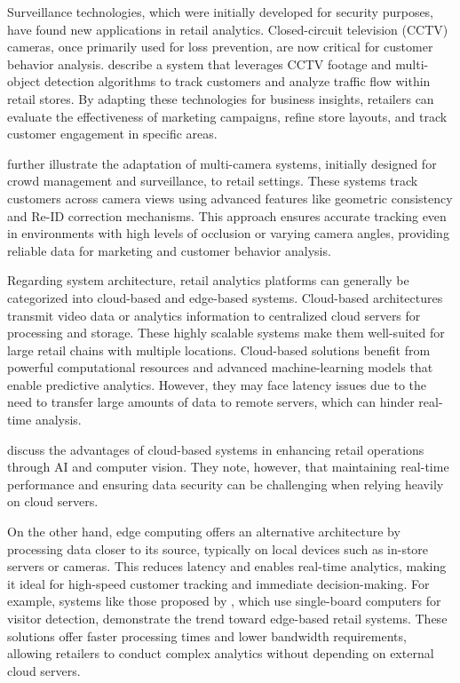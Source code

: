 {Surveillance technologies, which were initially developed for security purposes, have found new applications in retail analytics. Closed-circuit television (CCTV) cameras, once primarily used for loss prevention, are now critical for customer behavior analysis. \cite{Cobos2019} describe a system that leverages CCTV footage and multi-object detection algorithms to track customers and analyze traffic flow within retail stores. By adapting these technologies for business insights, retailers can evaluate the effectiveness of marketing campaigns, refine store layouts, and track customer engagement in specific areas.

\cite{Xie2024} further illustrate the adaptation of multi-camera systems, initially designed for crowd management and surveillance, to retail settings. These systems track customers across camera views using advanced features like geometric consistency and Re-ID correction mechanisms. This approach ensures accurate tracking even in environments with high levels of occlusion or varying camera angles, providing reliable data for marketing and customer behavior analysis.

Regarding system architecture, retail analytics platforms can generally be categorized into cloud-based and edge-based systems. Cloud-based architectures transmit video data or analytics information to centralized cloud servers for processing and storage. These highly scalable systems make them well-suited for large retail chains with multiple locations. Cloud-based solutions benefit from powerful computational resources and advanced machine-learning models that enable predictive analytics. However, they may face latency issues due to the need to transfer large amounts of data to remote servers, which can hinder real-time analysis.

\cite{Kulkarni2023} discuss the advantages of cloud-based systems in enhancing retail operations through AI and computer vision. They note, however, that maintaining real-time performance and ensuring data security can be challenging when relying heavily on cloud servers.

On the other hand, edge computing offers an alternative architecture by processing data closer to its source, typically on local devices such as in-store servers or cameras. This reduces latency and enables real-time analytics, making it ideal for high-speed customer tracking and immediate decision-making. For example, systems like those proposed by \cite{Erlina2023}, which use single-board computers for visitor detection, demonstrate the trend toward edge-based retail systems. These solutions offer faster processing times and lower bandwidth requirements, allowing retailers to conduct complex analytics without depending on external cloud servers.

}
